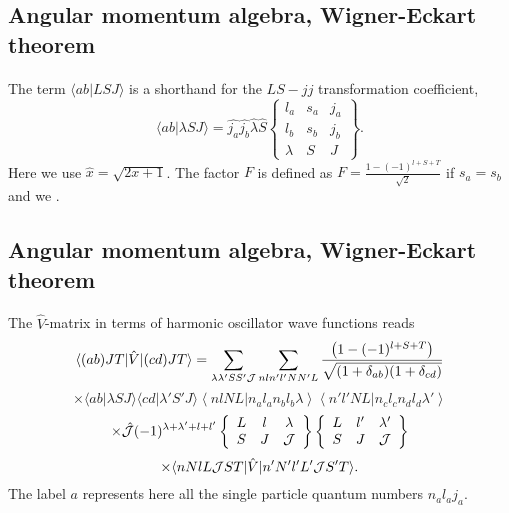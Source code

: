 \documentclass[%
twoside,                 %
final,                   %
10pt]{article}
\begin{document}
\subsection{Angular momentum algebra, Wigner-Eckart theorem}

\paragraph{}
The term $\langle ab|LSJ \rangle $ is a shorthand
for the $LS-jj$ transformation coefficient,
\[
     \langle ab|\lambda SJ \rangle = \hat{j_{a}}\hat{j_{b}}
     \hat{\lambda}\hat{S}
     \left\{
    \begin{array}{ccc}
       l_{a}&s_a&j_{a}\\
       l_{b}&s_b&j_{b}\\
       \lambda    &S          &J
    \end{array}
    \right\}.
\]
Here
we use $\hat{x} = \sqrt{2x +1}$.
The factor $F$ is defined as $F=\frac{1-(-1)^{l+S+T}}{\sqrt{2}}$ if
$s_a = s_b$ and we .



\subsection{Angular momentum algebra, Wigner-Eckart theorem}

\paragraph{}
The $\hat{V}$-matrix in terms of harmonic oscillator wave functions reads
\[
  \langle (ab)JT|\hat{V}|(cd)JT\rangle=
  {\displaystyle \sum_{\lambda \lambda ' SS' {\cal J}}\sum_{nln'l'NN'L}
  \frac{\left(1-(-1)^{l+S+T}\right)}{\sqrt{(1+\delta_{ab})
  (1+\delta_{cd})}}}
\]
\[
  \times\langle ab|\lambda SJ\rangle \langle cd|\lambda 'S'J\rangle
  \left\langle nlNL| n_{a}l_{a}n_{b}l_{b}\lambda\right\rangle
  \left\langle n'l'NL| n_{c}l_{c}n_{d}l_{d}\lambda ' \right\rangle
\]
\[
 \times \hat{{\cal J}}(-1)^{\lambda + \lambda ' +l +l'}
  \left\{\begin{array}{ccc}L&l&\lambda\\S&J&{\cal J}
  \end{array}\right\}
  \left\{\begin{array}{ccc}L&l'&\lambda '\\S&J&{\cal J}
  \end{array}\right\}
\]
\[
 \times\langle nNlL{\cal J}ST\vert\hat{V}\vert n'N'l'L'{\cal J}S'T\rangle.
\]
The label $a$ represents here all the single particle quantum numbers  
$n_{a}l_{a}j_{a}$.






\printindex
\end{document}
